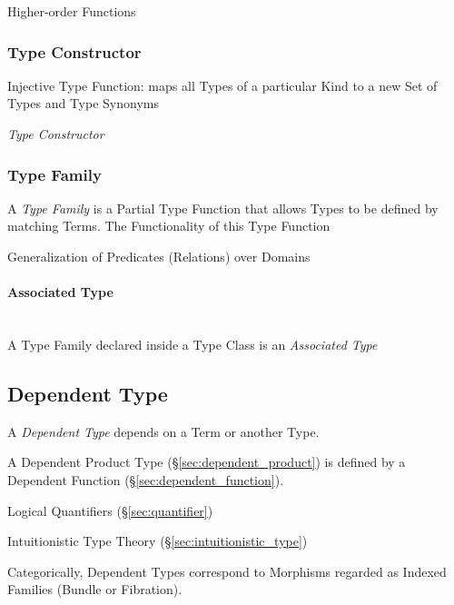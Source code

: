 Higher-order Functions



\subsubsection{Type Constructor}\label{sec:type_constructor}

Injective Type Function: maps all Types of a particular Kind to a new
Set of Types and Type Synonyms

\emph{Type Constructor}



\subsubsection{Type Family}\label{sec:type_family}

A \emph{Type Family} is a Partial Type Function that allows Types to
be defined by matching Terms. The Functionality of this Type Function

Generalization of Predicates (Relations) over Domains



\paragraph{Associated Type}\label{sec:associated_type}
\hfill \\

A Type Family declared inside a Type Class is an \emph{Associated
  Type}



\subsection{Dependent Type}\label{sec:dependent_type}

A \emph{Dependent Type} depends on a Term or another Type.

A Dependent Product Type (\S\ref{sec:dependent_product}) is defined by
a Dependent Function (\S\ref{sec:dependent_function}).

Logical Quantifiers (\S\ref{sec:quantifier})

Intuitionistic Type Theory (\S\ref{sec:intuitionistic_type})

Categorically, Dependent Types correspond to Morphisms regarded as
Indexed Families (Bundle or Fibration). %

